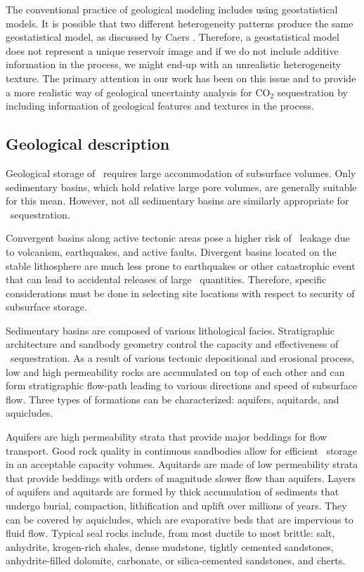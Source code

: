 The conventional practice of geological modeling includes using geostatistical
models. It is possible that two different heterogeneity patterns produce the
same geostatistical model, as discussed by Caers \cite{caers2002multiple}.
Therefore, a geostatistical model does not represent a unique reservoir image
and if we do not include additive information in the process, we might end-up
with an unrealistic heterogeneity
texture\cite{caers2002multiple,eaton2006importance}. The primary  attention in
our work has been on this issue and to provide a more realistic way of
geological uncertainty analysis for $\mbox{CO}_2$ sequestration by including
information of geological features and textures in the process. 


\subsection{Geological description}

Geological storage of \coo\ requires large accommodation of subsurface volumes. Only sedimentary basins, which hold relative large pore volumes, are generally suitable for this mean. However, not all sedimentary basins are similarly appropriate for \coo\ sequestration.

Convergent basins along active tectonic areas pose a higher risk of \coo\ leakage due to volcanism, earthquakes, and active faults. Divergent basins located on the stable lithosphere are much less prone to earthquakes or other catastrophic event that can lead to accidental releases of large \coo\ quantities. Therefore, specific considerations must be done in selecting site locations with respect to security of subsurface storage.

Sedimentary basins are composed of various lithological facies. Stratigraphic architecture and sandbody geometry control the capacity and effectiveness of \coo\ sequestration. As a result of various tectonic depositional and erosional process, low and high permeability rocks are accumulated on top of each other and can form stratigraphic flow-path leading to various directions and speed of subsurface flow. Three types of formations can be characterized: aquifers, aquitards, and aquicludes. 

Aquifers are high permeability strata that provide major beddings for flow transport. Good rock quality in continuous sandbodies allow for efficient \coo\ storage in an acceptable capacity volumes. Aquitards are made of low permeability strata that provide beddings with orders of magnitude slower flow than aquifers. Layers of aquifers and aquitards are formed by thick accumulation of sediments that undergo burial, compaction, lithification and uplift over millions of years. They can be covered by aquicludes, which are evaporative beds that are impervious to fluid flow. Typical seal rocks include, from most ductile to most brittle: salt, anhydrite, krogen-rich shales, dense mudstone, tightly cemented sandstones, anhydrite-filled dolomite, carbonate, or silica-cemented sandstones, and cherts.

